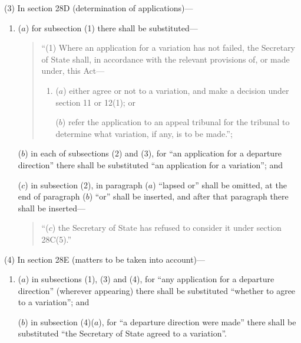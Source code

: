 \documentclass[12pt,a4paper]{article}
\begin{document}
(3) In section 28D (determination of applications)—
\begin{enumerate}\item[]
($a$) for subsection (1)  there shall be substituted—
\begin{quotation}
“(1) Where an application for a variation has not failed, the Secretary of State shall, in accordance with the relevant provisions of, or made under, this Act—
\begin{enumerate}\item[]
($a$) either agree or not to a variation, and make a decision under section 11 or 12(1); or

($b$) refer the application to an appeal tribunal for the tribunal to determine what variation, if any, is to be made.”;
\end{enumerate}
\end{quotation}

($b$) in each of subsections (2)  and (3), for “an application for a departure direction” there shall be substituted “an application for a variation”; and

($c$) in subsection (2), in paragraph ($a$)  “lapsed or” shall be omitted, at the end of paragraph ($b$)  “or” shall be inserted, and after that paragraph there shall be inserted—
\begin{quotation}
“($c$) the Secretary of State has refused to consider it under section 28C(5).”
\end{quotation}
\end{enumerate}

(4) In section 28E (matters to be taken into account)—
\begin{enumerate}\item[]
($a$) in subsections (1), (3)  and (4), for “any application for a departure direction” (wherever appearing) there shall be substituted “whether to agree to a variation”; and

($b$) in subsection (4)($a$), for “a departure direction were made” there shall be substituted “the Secretary of State agreed to a variation”.
\end{enumerate}
\end{document}
